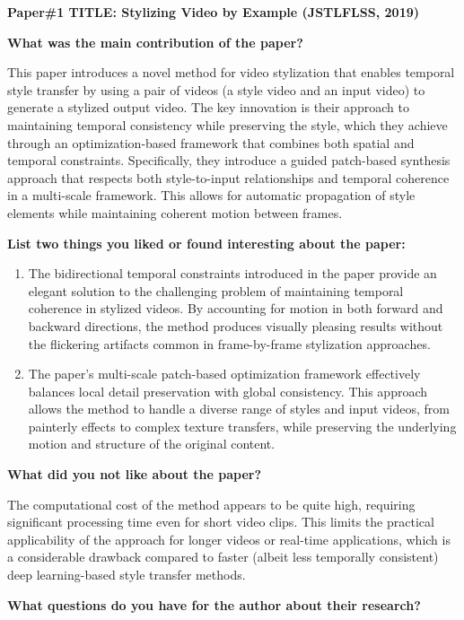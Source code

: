 \documentclass[
]{article}
\author{}
\date{}
\begin{document}
\textbf{Paper\#1 TITLE: Stylizing Video by Example (JSTLFLSS, 2019)}

\textbf{What was the main contribution of the paper?}

This paper introduces a novel method for video stylization that enables temporal style transfer by using a pair of videos (a style video and an input video) to generate a stylized output video. The key innovation is their approach to maintaining temporal consistency while preserving the style, which they achieve through an optimization-based framework that combines both spatial and temporal constraints. Specifically, they introduce a guided patch-based synthesis approach that respects both style-to-input relationships and temporal coherence in a multi-scale framework. This allows for automatic propagation of style elements while maintaining coherent motion between frames.

\textbf{List two things you liked or found interesting about the paper:}

\begin{enumerate}
\def\labelenumi{\arabic{enumi}.}
\item
  The bidirectional temporal constraints introduced in the paper provide an elegant solution to the challenging problem of maintaining temporal coherence in stylized videos. By accounting for motion in both forward and backward directions, the method produces visually pleasing results without the flickering artifacts common in frame-by-frame stylization approaches.
\item
  The paper's multi-scale patch-based optimization framework effectively balances local detail preservation with global consistency. This approach allows the method to handle a diverse range of styles and input videos, from painterly effects to complex texture transfers, while preserving the underlying motion and structure of the original content.
\end{enumerate}

\textbf{What did you not like about the paper?}

The computational cost of the method appears to be quite high, requiring significant processing time even for short video clips. This limits the practical applicability of the approach for longer videos or real-time applications, which is a considerable drawback compared to faster (albeit less temporally consistent) deep learning-based style transfer methods.

\textbf{What questions do you have for the author about their research?}
\end{document}
